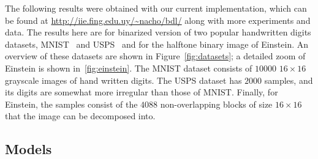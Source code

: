 \documentclass[twocolumn]{IEEEtran}
\theoremstyle{definition}
\begin{document}
%
The following results were obtained with our current implementation, which can be found at \url{http://iie.fing.edu.uy/~nacho/bdl/} along with more experiments and data. The results here are for binarized version of two popular handwritten digits datasets, MNIST~\cite{mnist} and USPS~\cite{usps} and for the halftone binary image of Einstein. An overview of these datasets are shown in Figure~\ref{fig:datasets}; a detailed zoom of Einstein is shown in~\ref{fig:einstein}. The MNIST dataset consists of $10000$ $16{\times}16$ grayscale images of hand written digits. The USPS dataset has $2000$ samples, and its digits are somewhat more irregular than those of MNIST. Finally, for Einstein, the samples consist of the $4088$ non-overlapping blocks of size $16{\times}16$ that the image can be decomposed into.

\subsection{Models}
\end{document}
